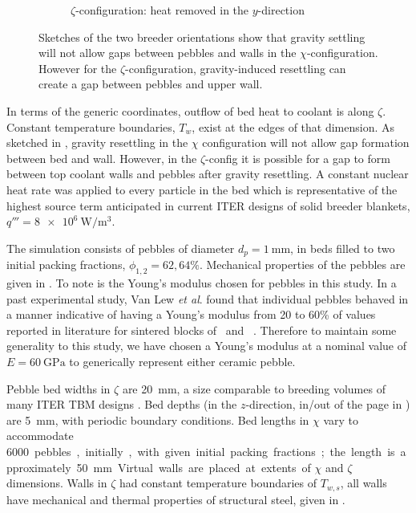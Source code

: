 \begin{figure}[!ht]
\begin{subfigure}[b]{0.44\textwidth}
        \caption{$\zeta$-configuration: heat removed in the $y$-direction}\label{fig:y-domain}
    \end{subfigure}
    \caption{Sketches of the two breeder orientations show that gravity settling will not allow gaps between pebbles and walls in the $\chi$-configuration. However for the $\zeta$-configuration, gravity-induced resettling can create a gap between pebbles and upper wall. }\label{fig:domains}
\end{figure}

In terms of the generic coordinates, outflow of bed heat to coolant is along $\zeta$. Constant temperature boundaries, $T_w$, exist at the edges of that dimension. As sketched in , gravity resettling in the $\chi$ configuration will not allow gap formation between bed and wall. However, in the $\zeta$-config it is possible for a gap to form between top coolant walls and pebbles after gravity resettling. A constant nuclear heat rate was applied to every particle in the bed which is representative of the highest source term anticipated in current ITER designs of solid breeder blankets, $q''' = \SI{8e6}{\watt\per\meter\cubed}$.

The simulation consists of pebbles of diameter $d_p = \SI{1}{\milli\meter}$, in beds filled to two initial packing fractions, $\phi_{1,2} = 62, 64\%$. Mechanical properties of the pebbles are given in . To note is the Young's modulus chosen for pebbles in this study. In a past experimental study, Van Lew \textit{et al}. found that individual pebbles behaved in a manner indicative of having a Young's modulus from 20 to 60\% of values reported in literature for sintered blocks of \lit~and \lis~\cite{VanLew2015a}. Therefore to maintain some generality to this study, we have chosen a Young's modulus at a nominal value of $E=\SI{60}{\giga\pascal}$ to generically represent either ceramic pebble.

Pebble bed widths in $\zeta$ are \SI{20}{\milli\meter}, a size comparable to breeding volumes of many ITER TBM designs \cite{Hernandez2013,Cho2008,Feng2012a}. Bed depths (in the $z$-direction, in/out of the page in ) are \SI{5}{\milli\meter}, with periodic boundary conditions. Bed lengths in $\chi$ vary to accommodate \SI{6000} pebbles, initially, with given initial packing fractions; the length is approximately \SI{50}{\milli\meter}. Virtual walls are placed at extents of $\chi$ and $\zeta$ dimensions. Walls in $\zeta$ had constant temperature boundaries of $T_{w,s}$, all walls have mechanical and thermal properties of structural steel, given in .

